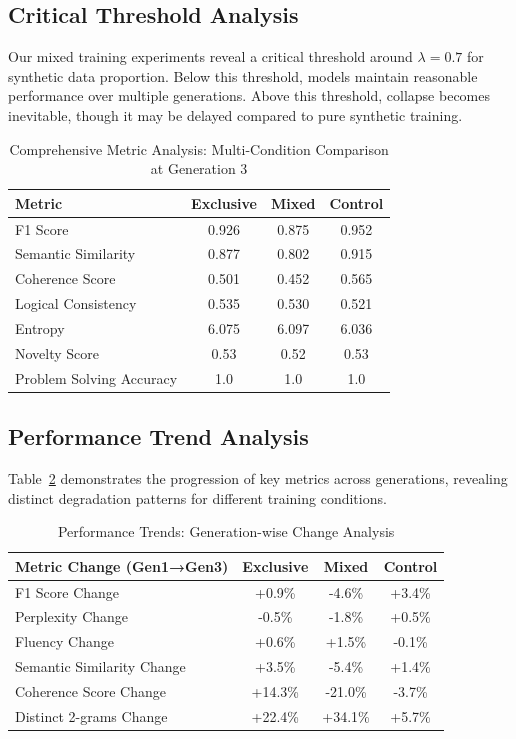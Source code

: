 \documentclass{article}
\begin{document}
\subsection{Critical Threshold Analysis}

Our mixed training experiments reveal a critical threshold around $\lambda = 0.7$ for synthetic data proportion. Below this threshold, models maintain reasonable performance over multiple generations. Above this threshold, collapse becomes inevitable, though it may be delayed compared to pure synthetic training.

\begin{table}[h]
\centering
\caption{Comprehensive Metric Analysis: Multi-Condition Comparison at Generation 3}
\label{tab:comprehensive_metrics}
\begin{tabular}{lccc}
\toprule
\textbf{Metric} & \textbf{Exclusive} & \textbf{Mixed} & \textbf{Control} \\
\midrule
F1 Score & 0.926 & 0.875 & 0.952 \\
Semantic Similarity & 0.877 & 0.802 & 0.915 \\
Coherence Score & 0.501 & 0.452 & 0.565 \\
Logical Consistency & 0.535 & 0.530 & 0.521 \\
Entropy & 6.075 & 6.097 & 6.036 \\
Novelty Score & 0.53 & 0.52 & 0.53 \\
Problem Solving Accuracy & 1.0 & 1.0 & 1.0 \\
\bottomrule
\end{tabular}
\end{table}

\subsection{Performance Trend Analysis}

Table~\ref{tab:trend_analysis} demonstrates the progression of key metrics across generations, revealing distinct degradation patterns for different training conditions.

\begin{table}[h]
\centering
\caption{Performance Trends: Generation-wise Change Analysis}
\label{tab:trend_analysis}
\begin{tabular}{lccc}
\toprule
\textbf{Metric Change (Gen1→Gen3)} & \textbf{Exclusive} & \textbf{Mixed} & \textbf{Control} \\
\midrule
F1 Score Change & +0.9\% & -4.6\% & +3.4\% \\
Perplexity Change & -0.5\% & -1.8\% & +0.5\% \\
Fluency Change & +0.6\% & +1.5\% & -0.1\% \\
Semantic Similarity Change & +3.5\% & -5.4\% & +1.4\% \\
Coherence Score Change & +14.3\% & -21.0\% & -3.7\% \\
Distinct 2-grams Change & +22.4\% & +34.1\% & +5.7\% \\
\bottomrule
\end{tabular}
\end{table}
\end{document}
